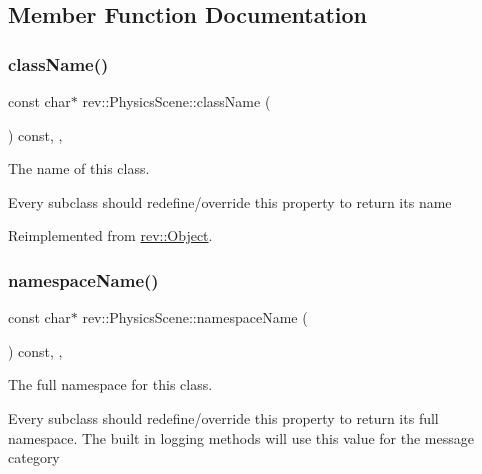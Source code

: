 \subsection{Member Function Documentation}
\mbox{\label{classrev_1_1_physics_scene_a7ea458478b0e1e2db563854807a66f8b}} 
\subsubsection{\texorpdfstring{className()}{className()}}
{\footnotesize\ttfamily const char$\ast$ rev\+::\+Physics\+Scene\+::class\+Name (\begin{DoxyParamCaption}{ }\end{DoxyParamCaption}) const\hspace{0.3cm}{\ttfamily [inline]}, {\ttfamily [override]}, {\ttfamily [virtual]}}



The name of this class. 

Every subclass should redefine/override this property to return its name 

Reimplemented from \mbox{\hyperlink{classrev_1_1_object_a7a2013f91169479b65cf93afdc5d9a68}{rev\+::\+Object}}.

\mbox{\label{classrev_1_1_physics_scene_ab8d105fd9f30fa787cf4776afcd3a864}} 
\subsubsection{\texorpdfstring{namespaceName()}{namespaceName()}}
{\footnotesize\ttfamily const char$\ast$ rev\+::\+Physics\+Scene\+::namespace\+Name (\begin{DoxyParamCaption}{ }\end{DoxyParamCaption}) const\hspace{0.3cm}{\ttfamily [inline]}, {\ttfamily [override]}, {\ttfamily [virtual]}}



The full namespace for this class. 

Every subclass should redefine/override this property to return its full namespace. The built in logging methods will use this value for the message category 

